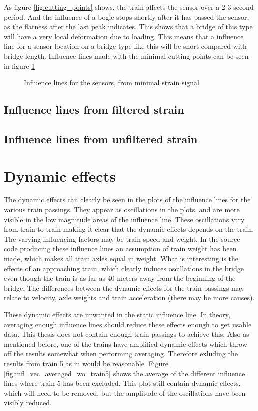 As figure \ref{fig:cutting_points} shows, the train affects the sensor over a 2-3 second period. And the influence of a bogie stops shortly after it has passed the sensor, as the flatness after the last peak indicates. This shows that a bridge of this type will have a very local deformation due to loading. This means that a influence line for a sensor location on a bridge type like this will be short compared with bridge length. Influence lines made with the minimal cutting points can be seen in figure \ref{}

\begin{figure}[H]
	\begin{adjustbox}{center}
		
	\end{adjustbox}
	\caption{Influence lines for the sensors, from minimal strain signal}
	\label{fig:infl_minimal}
\end{figure}
\subsection{Influence lines from filtered strain}

\subsection{Influence lines from unfiltered strain}

\section{Dynamic effects}
The dynamic effects can clearly be seen in the plots of the influence lines for the various train passings. They appear as oscillations in the plots, and are more visible in the low magnitude areas of the influence line. These oscillations vary from train to train making it clear that the dynamic effects depends on the train. The varying influencing factors may be train speed and weight. In the source code producing these influence lines an assumption of train weight has been made, which makes all train axles equal in weight.
What is interesting is the effects of an approaching train, which clearly induces oscillations in the bridge even though the train is as far as 40 meters away from the beginning of the bridge. The differences between the dynamic effects for the train passings may relate to velocity, axle weights and train acceleration (there may be more causes).

These dynamic effects are unwanted in the static influence line. In theory, averaging enough influence lines should reduce these effects enough to get usable data. This thesis does not contain enough train passings to achieve this. Also as mentioned before, one of the trains have amplified dynamic effects which throw off the results somewhat when performing averaging. Therefore exluding the results from train 5 as in would be reasonable. Figure \ref{fig:infl_vec_averaged_wo_train5} shows the average of the different influence lines where train 5 has been excluded. This plot still contain dynamic effects, which will need to be removed, but the amplitude of the oscillations have been visibly reduced.

